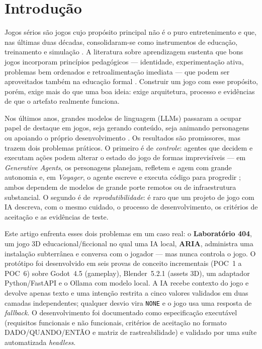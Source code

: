 \section{Introdução}
\label{sec:introducao}

Jogos sérios são jogos cujo propósito principal não é o puro entretenimento
\citep{abt1970serious} e que, nas últimas duas décadas, consolidaram-se como
instrumentos de educação, treinamento e simulação \citep{zyda2005from,
laamarti2014overview}. A literatura sobre aprendizagem sustenta que bons jogos
incorporam princípios pedagógicos --- identidade, experimentação ativa,
problemas bem ordenados e retroalimentação imediata --- que podem ser
aproveitados também na educação formal \citep{gee2003what}. Construir um jogo
com esse propósito, porém, exige mais do que uma boa ideia: exige arquitetura,
processo e evidências de que o artefato realmente funciona.

Nos últimos anos, grandes modelos de linguagem (LLMs) passaram a ocupar papel
de destaque em jogos, seja gerando conteúdo, seja animando personagens ou
apoiando o próprio desenvolvimento \citep{gallotta2024largelanguage}. Os
resultados são promissores, mas trazem dois problemas práticos. O primeiro é de
\emph{controle}: agentes que decidem e executam ações podem alterar o estado do
jogo de formas imprevisíveis --- em \emph{Generative Agents}, os personagens
planejam, refletem e agem com grande autonomia \citep{park2023generative} e, em
\emph{Voyager}, o agente escreve e executa código para progredir
\citep{wang2023voyager}; ambos dependem de modelos de grande porte remotos ou
de infraestrutura substancial. O segundo é de \emph{reprodutibilidade}: é raro
que um projeto de jogo com IA descreva, com o mesmo cuidado, o processo de
desenvolvimento, os critérios de aceitação e as evidências de teste.

Este artigo enfrenta esses dois problemas em um caso real: o \textbf{Laboratório
404}, um jogo 3D educacional/ficcional no qual uma IA local, \textbf{ARIA},
administra uma instalação subterrânea e conversa com o jogador --- mas nunca
controla o jogo. O protótipo foi desenvolvido em seis provas de conceito
incrementais (POC~1 a POC~6) sobre Godot~4.5 (gameplay), Blender~5.2.1 (assets
3D), um adaptador Python/FastAPI e o Ollama com modelo local. A IA recebe
contexto do jogo e devolve apenas texto e uma intenção restrita a cinco valores
validados em duas camadas independentes; qualquer desvio vira \texttt{NONE} e
o jogo usa uma resposta de \emph{fallback}. O desenvolvimento foi documentado
como especificação executável (requisitos funcionais e não funcionais, critérios
de aceitação no formato DADO/QUANDO/ENTÃO e matriz de rastreabilidade) e
validado por uma suíte automatizada \emph{headless}.

